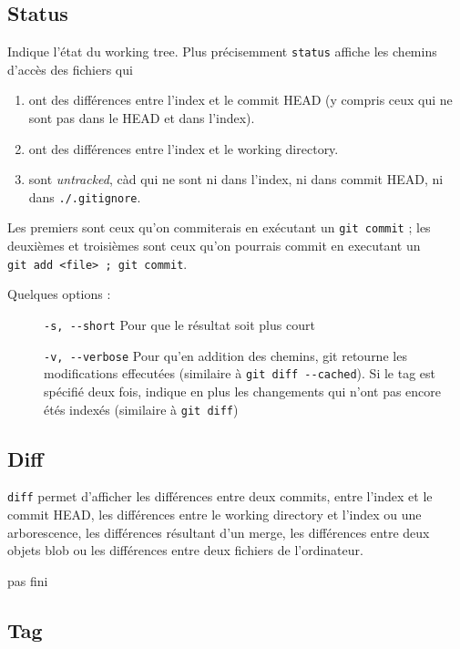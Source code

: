 \documentclass[a4paper, 12pt]{article}
\begin{document}
    \subsection{Status}
    Indique l'état du working tree. Plus précisemment \lstinline{status} affiche
    les chemins d'accès des fichiers qui
    \begin{enumerate}
        \item ont des différences entre l'index et le commit HEAD (y compris
        ceux qui ne sont pas dans le HEAD et dans l'index).
        \item ont des différences entre l'index et le working directory.
        \item sont \emph{untracked}, càd qui ne sont ni dans l'index, ni
        dans commit HEAD, ni dans \lstinline{./.gitignore}.
    \end{enumerate}

    Les premiers sont ceux qu'on commiterais en exécutant un 
    \lstinline{git commit} ; les deuxièmes et troisièmes sont ceux qu'on
    pourrais commit en executant un \\ 
    \lstinline{git add <file> ; git commit}.
    
    Quelques options :
    \begin{description}
        \item[] \lstinline{-s, --short} Pour que le résultat soit plus court 
        \item[] \lstinline{-v, --verbose} Pour qu'en addition des chemins, git
        retourne les modifications effecutées (similaire à 
        \lstinline{git diff --cached}). Si le tag est spécifié deux fois,
        indique en plus les changements qui n'ont pas encore étés indexés
        (similaire à \lstinline{git diff})
    \end{description}

    \subsection{Diff}
    \lstinline{diff} permet d'afficher les différences entre deux commits, entre
    l'index et le commit HEAD, les différences entre le working directory et
    l'index ou une arborescence, les différences résultant d'un merge, les
    différences entre deux objets blob ou les différences entre deux fichiers
    de l'ordinateur. 

    pas fini
    \subsection{Tag}
\end{document}
